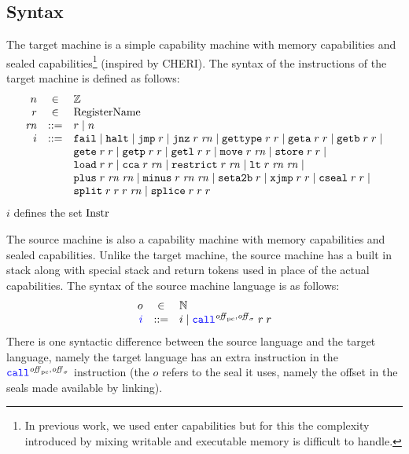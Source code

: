 \documentclass[a4paper]{article}
\begin{document}
\subsection{Syntax}
\label{sec:syntax}
The target machine is a simple capability machine with memory capabilities and sealed capabilities\footnote{In previous work, we used enter capabilities but for this the complexity introduced by mixing writable and executable memory is difficult to handle.} (inspired by CHERI). The syntax of the instructions of the target machine is defined as follows:
\[
\begin{array}{rcl}
n &\in & \ints \\
\com{r} &\in &  \tRegName \\
\com{\rn} &\defbnf &  \com{r} \mid n \\
\com{i} &\defbnf & \tfail \mid \thalt \mid \tjmp{\com{r}} \mid \tjnz{\com{r}}{\com{\rn}} \mid \tisptr{\com{r}}{\com{r}} \mid \tgeta{\com{r}}{\com{r}} \mid \tgetb{\com{r}}{\com{r}} \mid \\
      & &  \tgete{\com{r}}{\com{r}}\mid \tgetp{\com{r}}{\com{r}} \mid \tgetlin{\com{r}}{\com{r}} \mid \tmove{\com{r}}{\com{\rn}} \mid \tstore{\com{r}}{\com{r}} \mid\\
      & &  \tload{\com{r}}{\com{r}} \mid \tcca{\com{r}}{\com{\rn}} \mid \trestrict{\com{r}}{\com{\rn}} \mid \tlt{\com{r}}{\com{\rn}}{\com{\rn}} \mid \\
  & & \tplus{\com{r}}{\com{\rn}}{\com{\rn}} \mid \tminus{\com{r}}{\com{\rn}}{\com{\rn}} \mid \tsetatob{\com{r}} \mid \txjmp{\com{r}}{\com{r}} \mid \tcseal{\com{r}}{\com{r}} \mid \\ 
      & &   \tsplit{\com{r}}{\com{r}}{\com{r}}{\com{\rn}} \mid\tsplice{\com{r}}{\com{r}}{\com{r}} 
\end{array}
\]
$i$ defines the set $\mathrm{Instr}$


The source machine is also a capability machine with memory capabilities and sealed capabilities. Unlike the target machine, the source machine has a built in stack along with special stack and return tokens used in place of the actual capabilities. The syntax of the source machine language is as follows:
\[
  \begin{array}{rcl}
    o & \in & \nats \\
    \src{i} & \defbnf &  \com{i} \mid \scall{\offpc,\offsigma}{r}{r}
  \end{array}
\]
There is one syntactic difference between the source language and the target language, namely the target language has an extra instruction in the $\scall{\offpc,\offsigma}{}{}$ instruction (the $o$ refers to the seal it uses, namely the offset in the seals made available by linking). 
\end{document}
